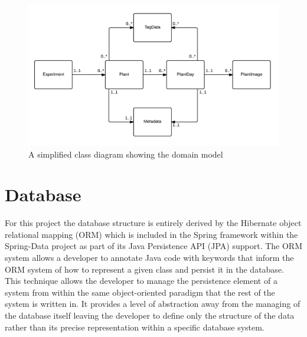 \begin{figure}[H]
    \centering
    \includegraphics[width=\textwidth]{images/design/domain2}
    \caption{A simplified class diagram showing the domain model}
    \label{fig:domain2}
\end{figure} 

\section{Database} \label{db}

For this project the database structure is entirely derived by the Hibernate\cite{_hibernate} object relational mapping (ORM) which is included in the Spring framework within the Spring-Data project as part of its Java Persistence API (JPA) support. The ORM system allows a developer to annotate Java code with keywords that inform the ORM system of how to represent a given class and persist it in the database. This technique allows the developer to manage the persistence element of a system from within the same object-oriented paradigm that the rest of the system is written in. It provides a level of abstraction away from the managing of the database itself leaving the developer to define only the structure of the data rather than its precise representation within a specific database system.

